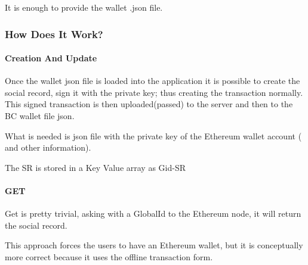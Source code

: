 It is enough to provide the wallet .json file.

\subsubsection{How Does It Work?}
\paragraph{Creation And Update}

Once the wallet json file is loaded into the application it is possible to create the social record, sign it with the private key; thus creating the transaction normally. This signed transaction is then uploaded(passed) to the server and then to the BC wallet file json.

What is needed is json file with the private key of the Ethereum wallet account ( and other information).

The SR is stored in a Key Value array as Gid-SR

\paragraph{GET}

Get is pretty trivial, asking with a GlobalId to the Ethereum node, it will return the social record.

This approach forces the users to have an Ethereum wallet, but it is conceptually more correct because it uses the offline transaction form.
